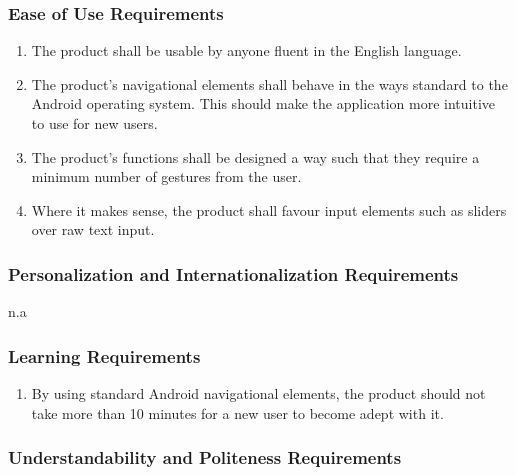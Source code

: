 \documentclass[]{article}
\begin{document}
\subsubsection{Ease of Use Requirements}
\label{ssub:ease_of_use_requirements}
\begin{enumerate}[{UH}1. ]
	\item The product shall be usable by anyone fluent in the English language.
	\item The product's navigational elements shall behave in the ways standard to the Android operating system. This should make the application more intuitive to use for new users.
	\item The product's functions shall be designed a way such that they require a minimum number of gestures from the user.
	\item Where it makes sense, the product shall favour input elements such as sliders over raw text input.
	\holdEnum
\end{enumerate}

\subsubsection{Personalization and Internationalization Requirements}
\label{ssub:personalization_and_internationalization_requirements}
n.a

\subsubsection{Learning Requirements}
\label{ssub:learning_requirements}
\begin{enumerate}[{UH}1. ]
	\resumeEnum
	\item By using standard Android navigational elements, the product should not take more than 10 minutes for a new user to become adept with it.
	\holdEnum
\end{enumerate}

\subsubsection{Understandability and Politeness Requirements}
\label{ssub:understandability_and_politeness_requirements}
\end{document}
